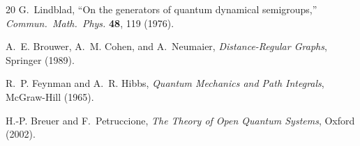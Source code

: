 \documentclass[11pt,a4paper]{article}
\begin{document}
\begin{thebibliography}{20}
G.~Lindblad,
``On the generators of quantum dynamical semigroups,''
\textit{Commun.\ Math.\ Phys.} \textbf{48}, 119 (1976).

A.~E. Brouwer, A.~M. Cohen, and A.~Neumaier,
\textit{Distance-Regular Graphs}, Springer (1989).

R.~P. Feynman and A.~R. Hibbs,
\textit{Quantum Mechanics and Path Integrals}, McGraw-Hill (1965).

H.-P. Breuer and F.~Petruccione,
\textit{The Theory of Open Quantum Systems}, Oxford (2002).

\end{thebibliography}
\end{document}
